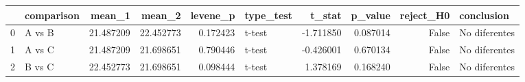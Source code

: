 \begin{tabular}{llrrrlrrrl}
\toprule
 & comparison & mean_1 & mean_2 & levene_p & type_test & t_stat & p_value & reject_H0 & conclusion \\
\midrule
0 & A vs B & 21.487209 & 22.452773 & 0.172423 & t-test & -1.711850 & 0.087014 & False & No diferentes \\
1 & A vs C & 21.487209 & 21.698651 & 0.790446 & t-test & -0.426001 & 0.670134 & False & No diferentes \\
2 & B vs C & 22.452773 & 21.698651 & 0.098444 & t-test & 1.378169 & 0.168240 & False & No diferentes \\
\bottomrule
\end{tabular}
